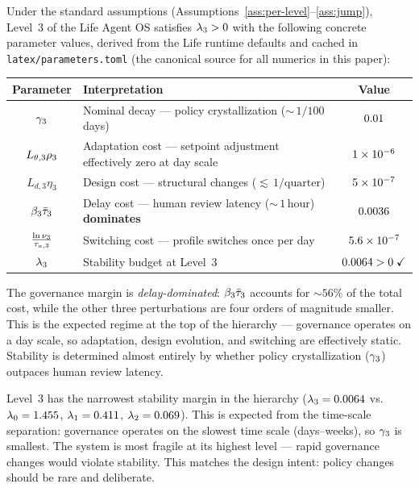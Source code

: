 \documentclass[11pt,a4paper]{article}
\begin{document}
\begin{proposition}
\label{prop:governance}
Under the standard assumptions (Assumptions~\ref{ass:per-level}--\ref{ass:jump}),
Level~3 of the Life Agent OS satisfies $\lambda_3 > 0$ with the following
concrete parameter values, derived from the Life runtime defaults and
cached in \texttt{latex/parameters.toml} (the canonical source for all
numerics in this paper):
\begin{center}
\begin{tabular}{@{}cp{6.8cm}c@{}}
  \toprule
  \textbf{Parameter} & \textbf{Interpretation} & \textbf{Value} \\
  \midrule
  $\gamma_3$ & Nominal decay --- policy crystallization
    (${\sim}\,1/100$ days) & $0.01$ \\
  $L_{\theta,3} \rho_3$ & Adaptation cost --- setpoint adjustment
    effectively zero at day scale & $1 \times 10^{-6}$ \\
  $L_{d,3} \eta_3$ & Design cost --- structural changes
    (${\lesssim}\,1/\text{quarter}$) & $5 \times 10^{-7}$ \\
  $\beta_3 \bar{\tau}_3$ & Delay cost --- human review latency
    (${\sim}\,1\,\text{hour}$) \textbf{dominates} & $0.0036$ \\
  $\frac{\ln \nu_3}{\taua[3]}$ & Switching cost --- profile switches
    once per day & $5.6 \times 10^{-7}$ \\
  \midrule
  $\lambda_3$ & Stability budget at Level~3
    & $0.0064 > 0\;\checkmark$ \\
  \bottomrule
\end{tabular}
\end{center}
The governance margin is \emph{delay-dominated}: $\beta_3 \bar{\tau}_3$
accounts for ${\sim}56\%$ of the total cost, while the other three
perturbations are four orders of magnitude smaller.  This is the expected
regime at the top of the hierarchy --- governance operates on a day
scale, so adaptation, design evolution, and switching are effectively
static.  Stability is determined almost entirely by whether policy
crystallization ($\gamma_3$) outpaces human review latency.
\end{proposition}

\begin{remark}
\label{rem:narrowest}
Level~3 has the narrowest stability margin in the hierarchy
($\lambda_3 = 0.0064$ vs.\ $\lambda_0 = 1.455$,
$\lambda_1 = 0.411$, $\lambda_2 = 0.069$).
This is expected from the time-scale separation: governance operates on
the slowest time scale (days--weeks), so $\gamma_3$ is smallest.  The
system is most fragile at its highest level --- rapid governance changes
would violate stability.  This matches the design intent: policy changes
should be rare and deliberate.
\end{remark}
\end{document}
